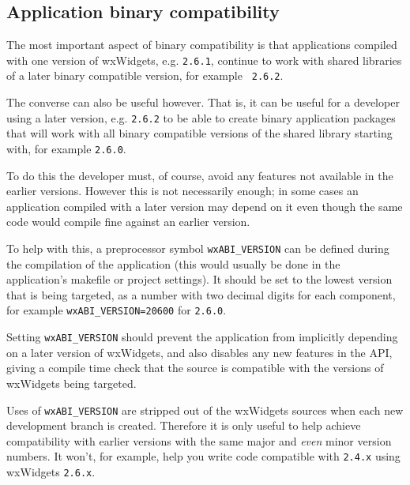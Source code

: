 \subsection{Application binary compatibility}\label{appbincompatibility}

The most important aspect of binary compatibility is that applications
compiled with one version of wxWidgets, e.g. {\tt 2.6.1}, continue to work
with shared libraries of a later binary compatible version, for example {\tt
2.6.2}.

The converse can also be useful however. That is, it can be useful for a
developer using a later version, e.g. {\tt 2.6.2} to be able to create binary
application packages that will work with all binary compatible versions of
the shared library starting with, for example {\tt 2.6.0}.

To do this the developer must, of course, avoid any features not available
in the earlier versions. However this is not necessarily enough; in some
cases an application compiled with a later version may depend on it even
though the same code would compile fine against an earlier version.

To help with this, a preprocessor symbol {\tt wxABI\_VERSION} can be defined
during the compilation of the application (this would usually be done in the
application's makefile or project settings). It should be set to the lowest
version that is being targeted, as a number with two decimal digits for each
component, for example {\tt wxABI\_VERSION=20600} for {\tt 2.6.0}.

Setting {\tt wxABI\_VERSION} should prevent the application from implicitly
depending on a later version of wxWidgets, and also disables any new features
in the API, giving a compile time check that the source is compatible with
the versions of wxWidgets being targeted.

Uses of {\tt wxABI\_VERSION} are stripped out of the wxWidgets sources when
each new development branch is created. Therefore it is only useful to help
achieve compatibility with earlier versions with the same major
and {\em even} minor version numbers. It won't, for example, help you write
code compatible with {\tt 2.4.x} using wxWidgets {\tt 2.6.x}.
